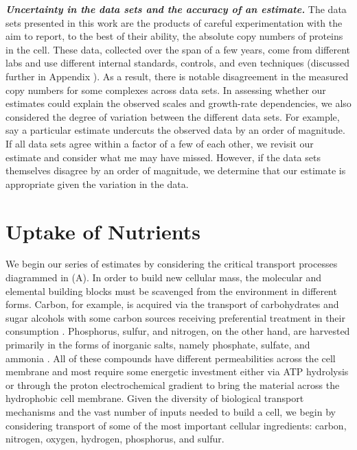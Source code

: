 \begin{featurebox}
\textbf{\itshape Uncertainty in the data sets and the accuracy of an estimate.}
The data sets presented in this work are the products of
careful experimentation with the aim to report, to the best of their ability,
the absolute copy numbers of proteins in the cell. These data, collected over
the span of a few years, come from different labs and use different internal
standards, controls, and even techniques (discussed further in Appendix ).
As a result, there is notable disagreement in the measured copy numbers for
some complexes across data sets. In assessing whether our estimates could explain the
observed scales and growth-rate dependencies, we also considered the degree of
variation between the different data sets. For example, say a particular
estimate undercuts the observed data by an order of magnitude. If all data sets
agree within a factor of a few of each other, we revisit our estimate and
consider what me may have missed. However, if the data sets themselves disagree
by an order of magnitude, we determine that our estimate is
appropriate given the variation in the data.
\label{box:estimate_rules}
\end{featurebox}


\section{Uptake of Nutrients}
We begin our series of estimates by considering the critical transport
processes diagrammed in (A). In order to build new cellular
mass, the molecular and elemental building blocks must be scavenged from the
environment in different forms. Carbon, for example, is acquired via the
transport of carbohydrates and sugar alcohols with some carbon sources
receiving preferential treatment in their consumption \citep{monod1947}.
Phosphorus, sulfur, and nitrogen, on the other hand, are harvested primarily
in the forms of inorganic salts, namely phosphate, sulfate, and ammonia
\citep{jun2018, assentoft2016, stasi2019, antonenko1997, rosenberg1977,
willsky1973}. All of these compounds have different permeabilities across the
cell membrane \cite{phillips2018} and most require some energetic investment
either via ATP hydrolysis or through the proton electrochemical gradient to
bring the material across the hydrophobic cell membrane. Given the diversity
of biological transport mechanisms and the vast number of inputs needed to
build a cell, we begin by considering transport of some of the most important
cellular ingredients: carbon, nitrogen, oxygen, hydrogen, phosphorus, and
sulfur.

